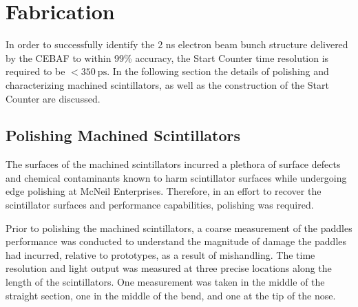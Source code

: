 \section{Fabrication} \label{sec:fab}

In order to successfully identify the 2 ns electron beam bunch structure delivered by the CEBAF to within 99\% accuracy, the \gx{} Start Counter time resolution is required to be $<350\ \mathrm{ps}$.  In the following section the details of polishing and characterizing machined scintillators, as well as the construction of the Start Counter are discussed.

\subsection{Polishing Machined Scintillators} \label{sec:fab_polish}

The surfaces of the machined scintillators incurred a plethora of surface defects and chemical contaminants known to harm scintillator surfaces while undergoing edge polishing at McNeil Enterprises.  Therefore, in an effort to recover the scintillator surfaces and performance capabilities, polishing was required.

Prior to polishing the machined scintillators, a coarse measurement of the paddles performance was conducted to understand the magnitude of damage the paddles had incurred, relative to prototypes, as a result of mishandling.  The time resolution and light output was measured at three precise locations along the length of the scintillators. One measurement was taken in the middle of the straight section, one in the middle of the bend, and one at the tip of the nose. 

